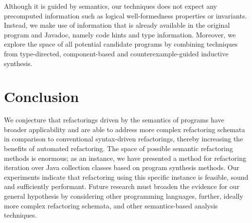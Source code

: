 \documentclass[sigconf,review,anonymous]{acmart}
\begin{document}
%
%
%

Although it is guided by semantics, our techniques does not expect any
precomputed information such as logical well-formedness properties or
invariants. Instead, we make use of information that is already
available in the original program and Javadoc, namely code hints and
type information. Moreover, we explore the space of all potential
candidate programs by combining techniques from type-directed,
component-based and counterexample-guided inductive synthesis.


\section{Conclusion}

We conjecture that refactorings driven by the semantics of programs have
broader applicability and are able to address more complex refactoring
schemata in comparison to conventional syntax-driven refactorings, thereby
increasing the benefits of automated refactoring.  The space of possible
semantic refactoring methods is enormous; as an instance, we have presented
a method for refactoring iteration over Java collection classes based on
program synthesis methods.  Our experiments indicate that refactoring using
this specific instance is feasible, sound and sufficiently performant. 
Future research must broaden the evidence for our general hypothesis by
considering other programming languages, further, ideally more complex
refactoring schemata, and other semantics-based analysis techniques.



%

\end{document}
